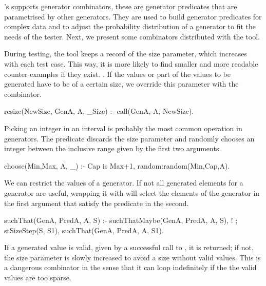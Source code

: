 \plqc{}'s supports generator combinators, these are generator predicates that are
parametrised by other generators.
%
They are used to build generator predicates for complex data and to
adjust the probability distribution of a generator to fit the needs of
the tester.
%
Next, we present some
combinators distributed with the tool.


During testing, the tool keeps a record of the size parameter, which
increases with each test case.
%
This way, it is more likely to find smaller and more readable
counter-examples if they exist.
.
%
If the values or part of the values to be generated have to be of a
certain size, we override this parameter with the 
combinator.
%
\begin{yapcode}
 resize(NewSize, GenA, A, _Size) :- call(GenA, A, NewSize).
\end{yapcode}


Picking an integer in an interval is probably the most common operation
in generators.
%
The  predicate discards the size parameter and randomly
chooses an integer between the inclusive range given by the first two
arguments.
%
\begin{yapcode}
 choose(Min,Max, A, _) :- Cap is Max+1, random:random(Min,Cap,A).
\end{yapcode}


We can restrict the values of a generator. %
%
If not all generated elements for a generator are useful, wrapping it
with  will select the elements of the generator in the
first argument that satisfy the predicate in the second.
%
\begin{yapcode}
 suchThat(GenA, PredA, A, S) :- suchThatMaybe(GenA, PredA, A, S), !
   ; stSizeStep(S, S1), suchThat(GenA, PredA, A, S1).
\end{yapcode}
%
If a generated value is valid, given by a successful call to
, it is returned; if not, the size parameter is
slowly increased to avoid a size without valid values.
%
This is a dangerous combinator in the sense that it can loop
indefinitely  if the the valid values %
are too sparse.



